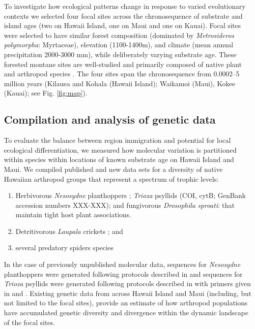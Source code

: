 \documentclass[12pt]{article}
\begin{document}
\begin{linenumbers}
To investigate how ecological patterns change in response to varied
evolutionary contexts we selected four focal sites across the
chronosequence of substrate and island ages (two on Hawaii Island, one
on Maui and one on Kauai). Focal sites were selected to have similar
forest composition (dominated by {\it Metrosideros polymorpha}:
Myrtaceae), elevation (1100-1400m), and climate (mean annual
precipitation 2000-3000 mm), while deliberately varying substrate
age. These forested montane sites are well-studied and primarily
composed of native plant and arthropod species .  The four sites span
the chronosequence from 0.0002–5 million years (Kilauea and Kohala
(Hawaii Island); Waikamoi (Maui), Kokee (Kauai); see
Fig. \ref{fig:map}).

\subsection*{Compilation and analysis of genetic data}

To evaluate the balance between region immigration and potential for
local ecological differentiation, we measured how molecular variation
is partitioned within species within locations of known substrate age
on Hawaii Island and Maui. We compiled published and new data sets for
a diversity of native Hawaiian arthropod groups that represent a
spectrum of trophic levels:
\begin{enumerate}
\item Herbivorous {\it Nesosydne} planthoppers \citep[COI and
  microsatellites;][GenBank accession numbers XXX-XXX]{goodman2012};
  {\it Trioza} psyllids (COI, cytB; GenBank accession numbers
  XXX-XXX); and fungivorous {\it Drosophila sproati}:
  \citep[COII;][]{eldon2013} that maintain tight host plant
  associations.
\item Detritivorous {\it Laupala} crickets
  \citep[AFLPs;][]{mendelson2004}; and
\item several predatory spiders species \citep[COI and
  allozymes;][]{roderick2012, croucher2012}
\end{enumerate}

In the case of previously unpublished molecular data, sequences for
{\it Nesosydne} planthoppers were generated following protocols
described in \citep{goodman2012} and sequences for {\it Trioza}
psyllids were generated following protocols described in
\cite{percy2003} with primers given in \cite{simon1994} and
\cite{timmermans2010}. Existing genetic data from across Hawaii Island
and Maui (including, but not limited to the focal sites), provide an
estimate of how arthropod populations have accumulated genetic
diversity and divergence within the dynamic landscape of the focal
sites.


\end{linenumbers}
\end{document}
